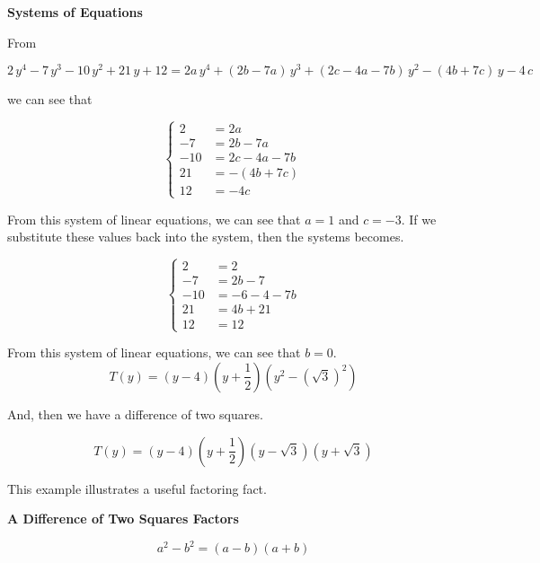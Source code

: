 \documentclass{ximera}
\begin{document}
\begin{procedure} \textbf{\textcolor{purple!85!blue}{Systems of Equations}} 



From

\[
2 \, y^4 - 7 \, y^3 - 10 \, y^2 + 21 \, y + 12 = 2 a \, y^4 + (2 b - 7 a) \, y^3 + (2 c - 4 a - 7 b) \, y^2 - (4 b + 7 c) \, y - 4 \, c
\]

we can see that 




\[
\begin{cases}
  2 &= 2 a   \\
  -7 &= 2 b - 7 a    \\
  -10 &= 2 c - 4 a - 7 b   \\
  21 &= -(4 b + 7 c)   \\
  12 &= -4 c
\end{cases}
\]


From this system of linear equations, we can see that $a = 1$ and $c = -3$.  If we substitute these values back into the system, then the systems becomes.






\[
\begin{cases}
  2 &= 2   \\
  -7 &= 2 b - 7     \\
  -10 &= -6 - 4 - 7 b   \\
  21 &= 4 b + 21   \\
  12 &= 12
\end{cases}
\]

From this system of linear equations, we can see that $b = 0$. \\


\[
T(y) = (y-4) \left(y+\frac{1}{2}\right) (y^2 - (\sqrt{3})^2)
\]



And, then we have a difference of two squares.



\[
T(y) = (y-4) \left(y+\frac{1}{2}\right) (y - \sqrt{3}) (y + \sqrt{3})
\]




\end{procedure}




This example illustrates a useful factoring fact.



\begin{fact} \textbf{\textcolor{purple!85!blue}{A Difference of Two Squares Factors}}

\[
a^2 - b^2 = (a-b)(a+b)
\]

\end{fact}
\end{document}

